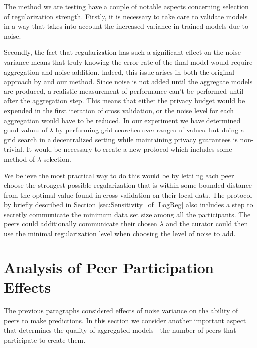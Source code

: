 The method we are testing have a couple of notable aspects concerning selection of regularization strength. Firstly, it is necessary to take care to validate models in a way that takes into account the increased variance in trained models due to noise.

Secondly, the fact that regularization has such a significant effect on the noise variance means that truly knowing the error rate of the final model would require aggregation and noise addition. Indeed, this issue arises in both the original approach by \cite{pathak2010diffprivhomo} and our method. Since noise is not added until the aggregate models are produced, a realistic measurement of performance can't be performed until after the aggregation step. This means that either the privacy budget would be expended in the first iteration of cross validation, or the noise level for each aggregation would have to be reduced. In our experiment we have determined good values of $\lambda$ by performing grid searches over ranges of values, but doing a grid search in a decentralized setting while maintaining privacy guarantees is non-trivial. It would be necessary to create a new protocol which includes some method of $\lambda$ selection. 

We believe the most practical way to do this would be by letti	ng each peer choose the strongest possible regularization that is within some bounded distance from the optimal value found in cross-validation on their local data. The protocol by \cite{pathak2010diffprivhomo} briefly described in Section \ref{sec:Sensitivity_of_LogReg} also includes a step to secretly communicate the minimum data set size among all the participants. The peers could additionally communicate their chosen $\lambda$ and the curator could then use the minimal regularization level when choosing the level of noise to add.

\section{Analysis of Peer Participation Effects}
\label{sec:aggregation_effects}

The previous paragraphs considered effects of noise variance on the ability of peers to make predictions. In this section we consider another important aspect that determines the quality of aggregated models - the number of peers that participate to create them. 

